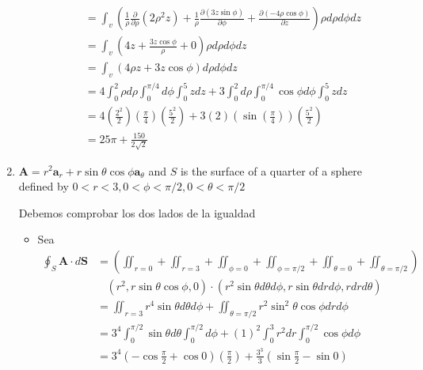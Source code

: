 \begin{problema}
\begin{enumerate}
\begin{sol}
\begin{itemize}
\begin{align*}
                &=\int_v \left(\frac{1}{\rho} \frac{\partial}{\partial \rho}\left(2\rho^2z\right)+\frac{1}{\rho} \frac{\partial (3z\sin \phi)}{\partial \phi}+\frac{\partial (-4\rho \cos\phi)}{\partial z}\right)\rho d\rho d\phi dz\\
                &= \int_v \left(4z+\frac{3z\cos\phi}{\rho}+0\right)\rho d\rho d\phi dz\\
                &= \int_v \left(4\rho z+3z\cos\phi\right) d\rho d\phi dz\\
                &= 4\int_{0}^{2}\rho d\rho\int_{0}^{\pi/4}d\phi  \int_0^5 zdz +3\int_{0}^{2}d\rho \int_{0}^{\pi/4}\cos\phi d\phi \int_0^5 zdz\\
                &= 4\left(\frac{2^2}{2}\right)\left(\frac{\pi}{4}\right)\left(\frac{5^2}{2}\right)+3\left(2\right)\left(\sin\left(
                    \frac{\pi}{4}
                \right)\right)\left(\frac{5^2}{2}\right)\\
                &= 25\pi +\frac{150}{2\sqrt{2}}
            \end{align*}
        \end{itemize}
    \end{sol}
    \item $\mathbf{A}=r^{2} \mathbf{a}_{r}+r \sin \theta \cos \phi \mathbf{a}_{\theta}$ and $S$ is the surface of a quarter of a sphere defined by $0<r<3,0<\phi<\pi / 2,0<\theta<\pi / 2$
    \begin{sol}
        Debemos comprobar los dos lados de la igualdad 
        \begin{itemize}
            \item Sea
            \begin{align*}
                \oint_{S} \mathbf{A} \cdot d \mathbf{S} &=\left(\iint_{r=0}+\iint_{r=3}+\iint_{\phi=0}+\iint_{\phi=\pi/2}+\iint_{\theta=0}+\iint_{\theta=\pi/2}\right)\\
                & \ \ \ \ \left(r^2,r\sin\theta\cos\phi,0\right)\cdot (r^2\sin\theta d\theta d\phi,r\sin \theta drd\phi, rdrd\theta)\\
                &= \iint_{r=3}r^4\sin\theta d\theta d\phi+\iint_{\theta=\pi/2}r^2\sin^2\theta\cos\phi drd\phi\\
                &= 3^4\int_0^{\pi/2}\sin\theta d\theta\int_{0}^{\pi/2}d\phi+(1)^2\int_{0}^{3}r^2dr \int_{0}^{\pi/2}\cos\phi d\phi\\
                &= 3^4(-\cos \frac{\pi}{2}+\cos 0)\left(\frac{\pi}{2}\right)+\frac{3^3}{3}\left(\sin\frac{\pi}{2}-\sin 0 \right)\\

\end{align*}
\end{itemize}
\end{sol}
\end{enumerate}
\end{problema}
